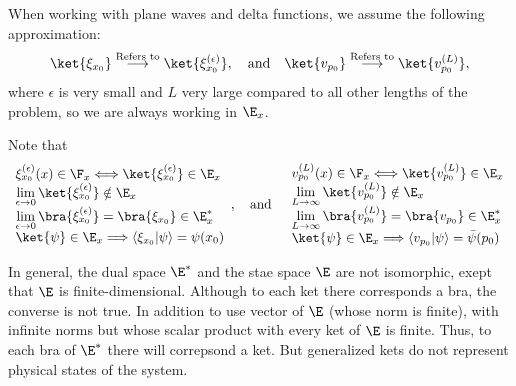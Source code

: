 When working with plane waves and delta functions, we assume the following approximation:
\begin{align}
    \ket{\xi_{x_0}}\stackrel{\text{Refers to}}{\longrightarrow}\ket{\xi_{x_0}^{(\epsilon)}},\quad\text{and}\quad\ket{v_{p_0}}\stackrel{\text{Refers to}}{\longrightarrow}\ket{v_{p_0}^{(L)}},
\end{align}
where $\epsilon$ is very small and $L$ very large compared to all other lengths of the problem, so we are always working in $\E_x$.

Note that 
\begin{align}
    \begin{array}{l}
        \xi_{x_0}^{(\epsilon)}(x)\in\F_x\Longleftrightarrow\ket{\xi_{x_0}^{(\epsilon)}}\in\E_x\\
        \lim\limits_{\epsilon\to0}\ket{\xi_{x_0}^{(\epsilon)}}\notin\E_x\\
        \lim\limits_{\epsilon\to0}\bra{\xi_{x_0}^{(\epsilon)}}=\bra{\xi_{x_0}}\in\E^*_x\\
        \ket{\psi}\in\E_x\Longrightarrow \langle\xi_{x_0}|\psi\rangle=\psi(x_0)
    \end{array},\quad\text{and}\quad
    \begin{array}{l}
        v_{p_0}^{(L)}(x)\in\F_x\Longleftrightarrow\ket{v_{p_0}^{(L)}}\in\E_x\\
        \lim\limits_{L\to\infty}\ket{v_{p_0}^{(L)}}\notin\E_x\\
        \lim\limits_{L\to\infty}\bra{v_{p_0}^{(L)}}=\bra{v_{p_0}}\in\E^*_x\\
        \ket{\psi}\in\E_x\Longrightarrow \langle v_{p_0}|\psi\rangle=\bar{\psi}(p_0)
    \end{array}
\end{align}

\begin{emphasizer}
    In general, the dual space $\E^*$ and the stae space $\E$ are not isomorphic, exept that $\E$ is finite-dimensional. 
    Although to each ket there corresponds a bra, the converse is not true. In addition to use vector of $\E$ (whose norm is finite),
     with infinite norms but whose scalar product with every ket of $\E$ is finite. Thus, to each bra of $\E^*$ there will
    correpsond a ket. But generalized kets do not represent physical states of the system.
\end{emphasizer}


